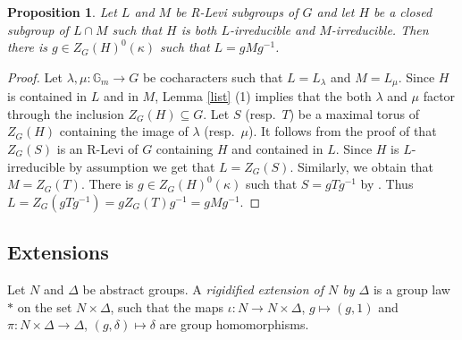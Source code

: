 \documentclass{amsart}
\newtheorem{prop}{Proposition}[section]
\theoremstyle{definition}
\theoremstyle{remark}
\newcommand{\Gm}{\mathbb G_{m}}
\begin{document}
 \begin{prop}\label{irr_conj} Let $L$ and $M$ be R-Levi subgroups of $G$ and let $H$ be a closed subgroup of $L\cap M$ 
 such that $H$ is both $L$-irreducible and $M$-irreducible. Then there is $g\in Z_G(H)^0(\kappa)$ 
 such that $L= g M g^{-1}$. 
 \end{prop} 
\begin{proof} Let $\lambda, \mu: \Gm\rightarrow G$ be cocharacters such that $L=L_{\lambda}$ and
$M=L_{\mu}$. Since $H$ is contained in $L$ and in $M$, Lemma \ref{list} (1) implies that 
the both $\lambda$ and $\mu$ factor through the inclusion $Z_G(H) \subseteq G$. Let $S$ (resp.~$T$) be a maximal torus of $Z_G(H)$ containing the image of $\lambda$ (resp.~$\mu$). It follows from the proof of \cite[Proposition 8.18]{borel} that $Z_G(S)$ is an 
R-Levi of $G$ containing $H$ and contained in $L$. Since $H$ is $L$-irreducible by assumption 
we get that $L=Z_G(S)$. Similarly, we obtain that $M=Z_G(T)$. There is $g\in Z_G(H)^0(\kappa)$ such that 
$S= g T g^{-1}$ by \cite[Proposition 11.19]{borel}. Thus $L=Z_G ( g T g^{-1}) = g Z_G(T)g^{-1} = g M g^{-1}$. 
\end{proof}

\subsection{Extensions}\label{sec_extensions}

Let $N$ and $\Delta$ be abstract groups. A \emph{rigidified extension of $N$ by $\Delta$} 
is a group law $\ast$ on the set $N\times \Delta$, such that the maps $\iota: N \rightarrow N\times \Delta$, $g\mapsto (g, 1)$ and $\pi: N\times \Delta\rightarrow 
\Delta$, $(g, \delta)\mapsto \delta$ are group homomorphisms.  
\end{document}
